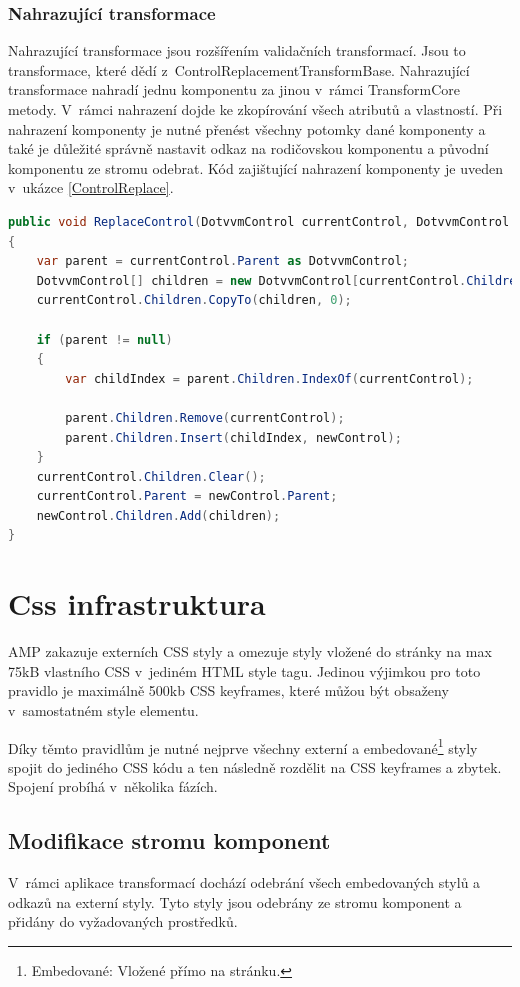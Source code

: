 \subsubsection{Nahrazující transformace}
    Nahrazující transformace jsou rozšířením validačních transformací. Jsou to transformace, které dědí z~ControlReplacementTransformBase. Nahrazující transformace nahradí jednu komponentu za jinou v~rámci TransformCore metody. V~rámci nahrazení dojde ke zkopírování všech atributů a vlastností. Při nahrazení komponenty je nutné přenést všechny potomky dané komponenty a také je důležité správně nastavit odkaz na rodičovskou komponentu a původní komponentu ze stromu odebrat. Kód zajištující nahrazení komponenty je uveden v~ukázce \ref{ControlReplace}.
    
    \begin{lstlisting}[language=c#, caption= Nahrazení jedné DotVVM komponenty za jinou. ,label=ControlReplace,captionpos=t]
public void ReplaceControl(DotvvmControl currentControl, DotvvmControl newControl)
{
    var parent = currentControl.Parent as DotvvmControl;
    DotvvmControl[] children = new DotvvmControl[currentControl.Children.Count];
    currentControl.Children.CopyTo(children, 0);

    if (parent != null)
    {
        var childIndex = parent.Children.IndexOf(currentControl);

        parent.Children.Remove(currentControl);
        parent.Children.Insert(childIndex, newControl);
    }
    currentControl.Children.Clear();
    currentControl.Parent = newControl.Parent;
    newControl.Children.Add(children);
}

\end{lstlisting}

\section{Css infrastruktura}
AMP zakazuje externích CSS styly a omezuje styly vložené do stránky na max 75kB vlastního CSS v~jediném HTML style tagu. Jedinou výjimkou pro toto pravidlo je maximálně 500kb CSS keyframes, které můžou být obsaženy v~samostatném style elementu.

Díky těmto pravidlům je nutné nejprve všechny externí a embedované\footnote{Embedované: Vložené přímo na stránku.} styly spojit do jediného CSS kódu a ten následně rozdělit na CSS keyframes a zbytek. Spojení probíhá v~několika fázích.
\subsection*{Modifikace stromu komponent}
V~rámci aplikace transformací dochází odebrání všech embedovaných stylů a odkazů na externí styly. Tyto styly jsou odebrány ze stromu komponent a přidány do vyžadovaných prostředků.

